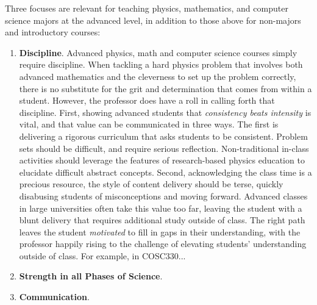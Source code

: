 \documentclass[../../main.tex]{subfiles}
\begin{document}
Three focuses are relevant for teaching physics, mathematics, and computer science majors at the advanced level, in addition to those above for non-majors and introductory courses:
\begin{enumerate}
\item \textbf{Discipline}.  Advanced physics, math and computer science courses simply require discipline.  When tackling a hard physics problem that involves both advanced mathematics and the cleverness to set up the problem correctly, there is no substitute for the grit and determination that comes from within a student.  However, the professor does have a roll in calling forth that discipline.  First, showing advanced students that \textit{consistency beats intensity} is vital, and that value can be communicated in three ways.  The first is delivering a rigorous curriculum that asks students to be consistent.  Problem sets should be difficult, and require serious reflection.  Non-traditional in-class activities should leverage the features of research-based physics education to elucidate difficult abstract concepts.  Second, acknowledging the class time is a precious resource, the style of content delivery should be terse, quickly disabusing students of misconceptions and moving forward.  Advanced classes in large universities often take this value too far, leaving the student with a blunt delivery that requires additional study outside of class.  The right path leaves the student \textit{motivated} to fill in gaps in their understanding, with the professor happily rising to the challenge of elevating students' understanding outside of class.  For example, in COSC330...
\item \textbf{Strength in all Phases of Science}.
\item \textbf{Communication}.
\end{enumerate}
\end{document}
